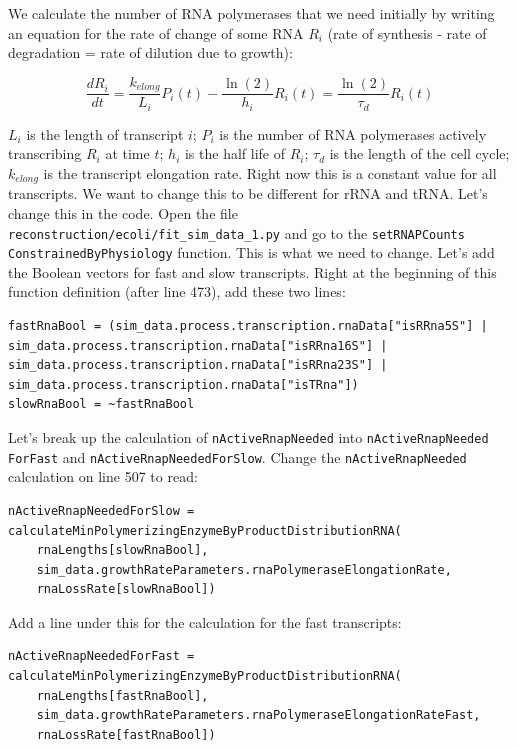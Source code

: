 \documentclass[12pt]{article}
\begin{document}
\par

We calculate the number of RNA polymerases that we need initially by writing an equation for the rate of change of some RNA $R_i$ (rate of synthesis - rate of degradation = rate of dilution due to growth):

$$
\frac{d R_i}{dt} = \frac{k_{elong}}{L_i}P_i(t) - \frac{\ln(2)}{h_i}R_i(t) = \frac{\ln(2)}{\tau_d}R_i(t)
$$


$L_i$ is the length of transcript $i$; $P_i$ is the number of RNA polymerases actively transcribing $R_i$ at time $t$; $h_i$ is the half life of $R_i$; $\tau_d$ is the length of the cell cycle; $k_{elong}$ is the transcript elongation rate. Right now this is a constant value for all transcripts. We want to change this to be different for rRNA and tRNA. Let's change this in the code. Open the file \texttt{reconstruction/ecoli/fit\_sim\_data\_1.py} and go to the \texttt{setRNAPCounts \allowbreak ConstrainedByPhysiology} function. This is what we need to change. Let's add the Boolean vectors for fast and slow transcripts. Right at the beginning of this function definition (after line 473), add these two lines:

\lstset{language=Python}
\begin{lstlisting}
fastRnaBool = (sim_data.process.transcription.rnaData["isRRna5S"] | sim_data.process.transcription.rnaData["isRRna16S"] | sim_data.process.transcription.rnaData["isRRna23S"] | sim_data.process.transcription.rnaData["isTRna"])
slowRnaBool = ~fastRnaBool
\end{lstlisting}

Let's break up the calculation of \texttt{nActiveRnapNeeded} into \texttt{nActiveRnapNeeded \allowbreak ForFast} and \texttt{nActiveRnapNeededForSlow}. Change the \texttt{nActiveRnapNeeded} calculation on line 507 to read:

\begin{lstlisting}
nActiveRnapNeededForSlow = calculateMinPolymerizingEnzymeByProductDistributionRNA(
    rnaLengths[slowRnaBool], 
    sim_data.growthRateParameters.rnaPolymeraseElongationRate, 
    rnaLossRate[slowRnaBool])
\end{lstlisting}

Add a line under this for the calculation for the fast transcripts:

\begin{lstlisting}
nActiveRnapNeededForFast = calculateMinPolymerizingEnzymeByProductDistributionRNA(
    rnaLengths[fastRnaBool], 
    sim_data.growthRateParameters.rnaPolymeraseElongationRateFast, 
    rnaLossRate[fastRnaBool])
\end{lstlisting}
\end{document}
